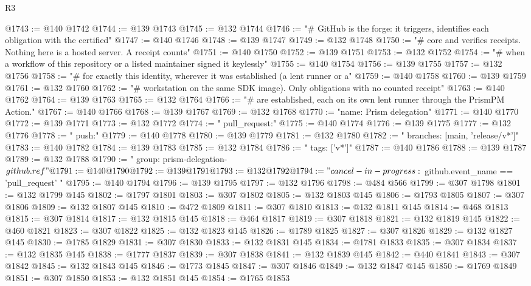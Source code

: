 \begin{lexlean}{R3}
\begin{coremodule}
@1743 := @140 @1742
@1744 := @139 @1743
@1745 := @132 @1744
@1746 := "# GitHub is the forge: it triggers, identifies each obligation with the certified"
@1747 := @140 @1746
@1748 := @139 @1747
@1749 := @132 @1748
@1750 := "# core and verifies receipts. Nothing here is a hosted server. A receipt counts"
@1751 := @140 @1750
@1752 := @139 @1751
@1753 := @132 @1752
@1754 := "# when a workflow of this repository or a listed maintainer signed it keylessly"
@1755 := @140 @1754
@1756 := @139 @1755
@1757 := @132 @1756
@1758 := "# for exactly this identity, wherever it was established (a lent runner or a"
@1759 := @140 @1758
@1760 := @139 @1759
@1761 := @132 @1760
@1762 := "# workstation on the same SDK image). Only obligations with no counted receipt"
@1763 := @140 @1762
@1764 := @139 @1763
@1765 := @132 @1764
@1766 := "# are established, each on its own lent runner through the PrismPM Action."
@1767 := @140 @1766
@1768 := @139 @1767
@1769 := @132 @1768
@1770 := "name: Prism delegation"
@1771 := @140 @1770
@1772 := @139 @1771
@1773 := @132 @1772
@1774 := "  pull_request:"
@1775 := @140 @1774
@1776 := @139 @1775
@1777 := @132 @1776
@1778 := "  push:"
@1779 := @140 @1778
@1780 := @139 @1779
@1781 := @132 @1780
@1782 := "    branches: [main, 'release/v*']"
@1783 := @140 @1782
@1784 := @139 @1783
@1785 := @132 @1784
@1786 := "    tags: ['v*']"
@1787 := @140 @1786
@1788 := @139 @1787
@1789 := @132 @1788
@1790 := "  group: prism-delegation-${{ github.ref }}"
@1791 := @140 @1790
@1792 := @139 @1791
@1793 := @132 @1792
@1794 := "  cancel-in-progress: ${{ github.event_name == 'pull_request' }}"
@1795 := @140 @1794
@1796 := @139 @1795
@1797 := @132 @1796
@1798 := @484 @566
@1799 := @307 @1798
@1801 := @132 @1799 @145
@1802 := @1797 @1801
@1803 := @307 @1802
@1805 := @132 @1803 @145
@1806 := @1793 @1805
@1807 := @307 @1806
@1809 := @132 @1807 @145
@1810 := @472 @1809
@1811 := @307 @1810
@1813 := @132 @1811 @145
@1814 := @468 @1813
@1815 := @307 @1814
@1817 := @132 @1815 @145
@1818 := @464 @1817
@1819 := @307 @1818
@1821 := @132 @1819 @145
@1822 := @460 @1821
@1823 := @307 @1822
@1825 := @132 @1823 @145
@1826 := @1789 @1825
@1827 := @307 @1826
@1829 := @132 @1827 @145
@1830 := @1785 @1829
@1831 := @307 @1830
@1833 := @132 @1831 @145
@1834 := @1781 @1833
@1835 := @307 @1834
@1837 := @132 @1835 @145
@1838 := @1777 @1837
@1839 := @307 @1838
@1841 := @132 @1839 @145
@1842 := @440 @1841
@1843 := @307 @1842
@1845 := @132 @1843 @145
@1846 := @1773 @1845
@1847 := @307 @1846
@1849 := @132 @1847 @145
@1850 := @1769 @1849
@1851 := @307 @1850
@1853 := @132 @1851 @145
@1854 := @1765 @1853

\end{coremodule}
\end{lexlean}
